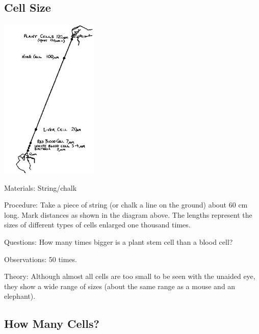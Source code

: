 \begin{multicols}{2}
\subsection{Cell Size}

\begin{center}
\includegraphics[width=0.35\textwidth]{./img/source/cell-size.png}
\end{center}

\begin{description*}
\item[Materials:]{String/chalk}
\item[Procedure:]{Take a piece of string (or chalk a line on the ground) about 60 cm long. Mark distances as
shown in the diagram above. The lengths represent the sizes of different types of cells
enlarged one thousand times.}
\item[Questions:]{How many times bigger is a plant stem cell than a blood cell?}
\item[Observations:]{50 times.}
\item[Theory:]{Although almost all cells are too small to be seen with the unaided eye, they show a wide
range of sizes (about the same range as a mouse and an elephant).}
\end{description*}

\subsection{How Many Cells?} %


\end{multicols}
